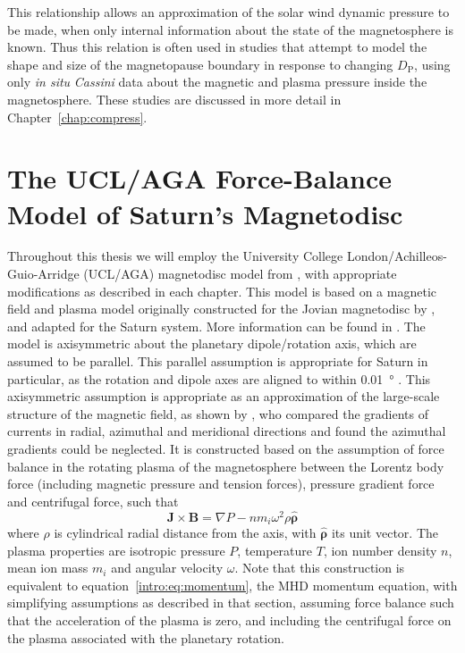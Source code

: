 This relationship allows an approximation of the solar wind dynamic pressure to be made, when only internal information about the state of the magnetosphere is known. 
Thus this relation is often used in studies that attempt to model the shape and size of the magnetopause boundary in response to changing $D_\mathrm{P}$, using only \textit{in situ} \textit{Cassini} data about the magnetic and plasma pressure inside the magnetosphere. These studies are discussed in more detail in Chapter~\ref{chap:compress}.

\section{The UCL/AGA Force-Balance Model of Saturn's Magnetodisc}\label{intro:sec:forcebalancemodel}
Throughout this thesis we will employ the University College London/Achilleos-Guio-Arridge (UCL/AGA) magnetodisc model from \citet{achilleos2010a,achilleos2010b}, with appropriate modifications as described in each chapter. This model is based on a magnetic field and plasma model originally constructed for the Jovian magnetodisc by \citet{caudal1986}, and adapted for the Saturn system. More information can be found in \citet{achilleos2010a, achilleos2010b}. The model is axisymmetric about the planetary dipole/rotation axis, which are assumed to be parallel. This parallel assumption is appropriate for Saturn in particular, as the rotation and dipole axes are aligned to within \SI{0.01}{\degree} \citep{dougherty2018}. This axisymmetric assumption is appropriate as an approximation of the large-scale structure of the magnetic field, as shown by \citet{hunt2014}, who compared the gradients of currents in radial, azimuthal and meridional directions and found the azimuthal gradients could be neglected. It is constructed based on the assumption of force balance in the rotating plasma of the magnetosphere between the Lorentz body force (including magnetic pressure and tension forces), pressure gradient force and centrifugal force, such that 
\begin{equation}\label{intro:eq:forcebalance}
\boldsymbol{J} \times \boldsymbol{B} = \nabla P - nm_i\omega^2\rho\boldsymbol{\hat{\rho}}
\end{equation}
where $\rho$ is cylindrical radial distance from the axis, with $\boldsymbol{\hat{\rho}}$ its unit vector. The plasma properties are isotropic pressure $P$, temperature $T$, ion number density $n$, mean ion mass $m_i$ and angular velocity $\omega$. Note that this construction is equivalent to equation~\ref{intro:eq:momentum}, the MHD momentum equation, with simplifying assumptions as described in that section, assuming force balance such that the acceleration of the plasma is zero, and including the centrifugal force on the plasma associated with the planetary rotation.

